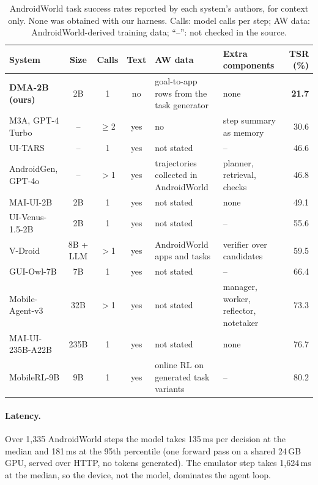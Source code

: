 \documentclass{article}
\newcommand{\ours}{DMA-2B}
\begin{document}
\begin{table}[t]
\centering
\caption{AndroidWorld task success rates reported by each system's authors, for context only. None was obtained
with our harness. Calls: model calls per step; AW data: AndroidWorld-derived training data; ``--'': not checked in
the source.}
\label{tab:awctx}
\small
\setlength{\tabcolsep}{4pt}
\begin{tabular}{@{}l c c c L{3.2cm} L{2.8cm} r@{}}
\toprule
System & Size & Calls & Text & AW data & Extra components & TSR (\%) \\
\midrule
\textbf{\ours{} (ours)} & 2B & 1 & no & goal-to-app rows from the task generator & none & \textbf{21.7} \\
M3A, GPT-4 Turbo \citep{androidworld2024} & -- & $\geq$2 & yes & no & step summary as memory & 30.6 \\
UI-TARS \citep{uitars2025} & -- & 1 & yes & not stated & -- & 46.6 \\
AndroidGen, GPT-4o \citep{androidgen2025} & -- & $>$1 & yes & trajectories collected in AndroidWorld & planner, retrieval, checks & 46.8 \\
MAI-UI-2B \citep{maiui2025} & 2B & 1 & yes & not stated & none & 49.1 \\
UI-Venus-1.5-2B \citep{uivenus15} & 2B & 1 & yes & not stated & -- & 55.6 \\
V-Droid \citep{vdroid2025} & 8B + LLM & $>$1 & yes & AndroidWorld apps and tasks & verifier over candidates & 59.5 \\
GUI-Owl-7B \citep{mobileagentv3} & 7B & 1 & yes & not stated & -- & 66.4 \\
Mobile-Agent-v3 \citep{mobileagentv3} & 32B & $>$1 & yes & not stated & manager, worker, reflector, notetaker & 73.3 \\
MAI-UI-235B-A22B \citep{maiui2025} & 235B & 1 & yes & not stated & none & 76.7 \\
MobileRL-9B \citep{mobilerl2025} & 9B & 1 & yes & online RL on generated task variants & -- & 80.2 \\
\bottomrule
\end{tabular}
\end{table}

\paragraph{Latency.}
Over 1{,}335 AndroidWorld steps the model takes 135\,ms per decision at the median and 181\,ms at the 95th
percentile (one forward pass on a shared 24\,GB GPU, served over HTTP, no tokens generated). The emulator step
takes 1{,}624\,ms at the median, so the device, not the model, dominates the agent loop.
\end{document}
